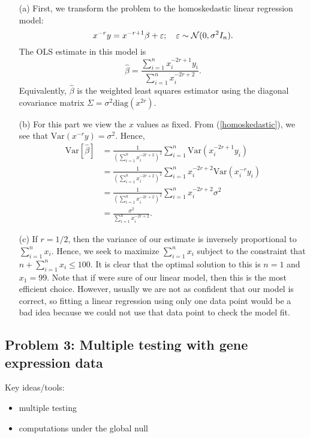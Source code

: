 \begin{enumerate}
\item[(a)] First, we transform the problem to the homoskedastic linear regression model:
\begin{equation}\label{homoskedastic}
x^{-r}y = x^{-r+1}\beta + {\varepsilon}; \quad {\varepsilon} \sim {\mathcal N}(0, \sigma^2 I_n).
\end{equation}
The OLS estimate in this model is 
\begin{equation*}
\hat \beta = \frac{\sum_{i=1}^n x_i^{-2r+1}y_i}{\sum_{i=1}^n x_i^{-2r + 2}}.
\end{equation*}
Equivalently, $\hat{\beta}$ is the weighted least squares estimator using the diagonal covariance matrix $\Sigma = \sigma^2 \text{diag}(x^{2r})$. 

\item[(b)] For this part we view the $x$ values as fixed. From (\ref{homoskedastic}), we see that $\text{Var}(x^{-r} y) = \sigma^2$. Hence,
\begin{align*}
\text{Var}[\hat \beta] &= \frac{1}{\left( \sum_{i=1}^n x_i^{-2r + 2} \right)^2} \sum_{i=1}^n \text{Var} \left( x_i^{-2r+1}y_i\right) \\
&= \frac{1}{\left(\sum_{i=1}^n x_i^{-2r + 2} \right)^2} \sum_{i=1}^n x_i^{-2r + 2} \text{Var} \left( x_i^{-r}y_i\right) \\
&= \frac{1}{\left(\sum_{i=1}^n x_i^{-2r + 2} \right)^2} \sum_{i=1}^n x_i^{-2r + 2} \sigma^2 \\
&= \frac{\sigma^2}{\sum_{i=1}^n x_i^{-2r + 2}}.
\end{align*}

\item[(c)] If $r = 1/2$, then the variance of our estimate is inversely proportional to $\sum_{i = 1}^n x_i$. Hence, we seek to maximize $\sum_{i = 1}^n x_i$ subject to the constraint that $n + \sum_{i = 1}^n x_i \leq 100$. It is clear that the optimal solution to this is $n = 1$ and $x_1 = 99$. Note that if were sure of our linear model, then this is the most efficient choice. However, usually we are not as confident that our model is correct, so fitting a linear regression using only one data point would be a bad idea because we could not use that data point to check the model fit.

\end{enumerate}


\subsection*{Problem 3: Multiple testing with gene expression data}
Key ideas/tools:
\begin{itemize}
\item multiple testing
\item computations under the global null
\end{itemize}


